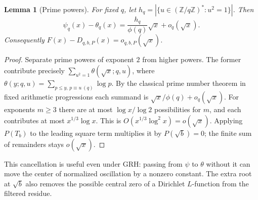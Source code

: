 \documentclass[11pt]{article}
\newtheorem{lemma}[theorem]{Lemma}
\theoremstyle{definition}\newtheorem{definition}[theorem]{Definition}
\newcommand{\thq}{\theta_q}
\newcommand{\psq}{\psi_q}
\begin{document}
\begin{lemma}[Prime powers]\label{lem:squares}
For fixed $q$, let $h_q=|\{u\in(\mathbb Z/q\mathbb Z)^*:u^2=1\}|$. Then
\[
 \psq(x)-\thq(x)=\frac{h_q}{\phi(q)}\sqrt{x}+o_q(\sqrt x).
\]
Consequently $F(x)-D_{q,b,P}(x)=o_{q,b,P}(\sqrt x)$.
\end{lemma}
\begin{proof}
Separate prime powers of exponent $2$ from higher powers. The former contribute precisely $\sum_{u^2=1}\theta(\sqrt{x};q,u)$, where $\theta(y;q,u)=\sum_{p\le y,\,p\equiv u\ (q)}\log p$. By the classical prime number theorem in fixed arithmetic progressions each summand is $\sqrt{x}/\phi(q)+o_q(\sqrt{x})$. For exponents $m\ge3$ there are at most $\log x/\log2$ possibilities for $m$, and each contributes at most $x^{1/3}\log x$. This is $O(x^{1/3}\log^2 x)=o(\sqrt x)$. Applying $P(T_b)$ to the leading square term multiplies it by $P(\sqrt b)=0$; the finite sum of remainders stays $o(\sqrt x)$.
\end{proof}
This cancellation is useful even under GRH: passing from $\psi$ to $\theta$ without it can move the center of normalized oscillation by a nonzero constant. The extra root at $\sqrt b$ also removes the possible central zero of a Dirichlet $L$-function from the filtered residue.
\end{document}
